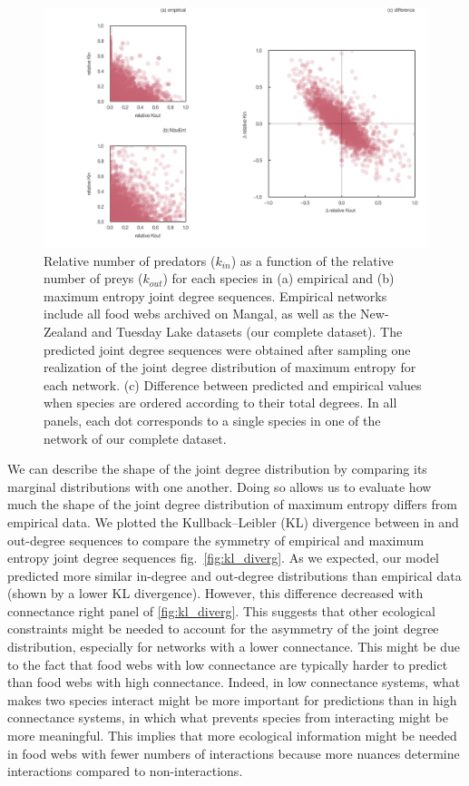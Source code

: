 \documentclass[10pt,oneside]{article}
\makeatletter
\def\maxwidth{\ifdim\Gin@nat@width>\linewidth\linewidth
\else\Gin@nat@width\fi}
\let\Oldincludegraphics\includegraphics
\renewcommand{\includegraphics}[1]{\Oldincludegraphics[width=\maxwidth]{#1}}
\makeatother
\begin{document}
\begin{figure}
\hypertarget{fig:joint_dd}{%
\centering
\includegraphics{figures/joint_degree_dist.png}
\caption{Relative number of predators (\(k_{in}\)) as a function of the
relative number of preys (\(k_{out}\)) for each species in (a) empirical
and (b) maximum entropy joint degree sequences. Empirical networks
include all food webs archived on Mangal, as well as the New-Zealand and
Tuesday Lake datasets (our complete dataset). The predicted joint degree
sequences were obtained after sampling one realization of the joint
degree distribution of maximum entropy for each network. (c) Difference
between predicted and empirical values when species are ordered
according to their total degrees. In all panels, each dot corresponds to
a single species in one of the network of our complete
dataset.}\label{fig:joint_dd}
}
\end{figure}

We can describe the shape of the joint degree distribution by comparing
its marginal distributions with one another. Doing so allows us to
evaluate how much the shape of the joint degree distribution of maximum
entropy differs from empirical data. We plotted the Kullback--Leibler
(KL) divergence between in and out-degree sequences to compare the
symmetry of empirical and maximum entropy joint degree sequences
fig.~\ref{fig:kl_diverg}. As we expected, our model predicted more
similar in-degree and out-degree distributions than empirical data
(shown by a lower KL divergence). However, this difference decreased
with connectance right panel of \ref{fig:kl_diverg}. This suggests that
other ecological constraints might be needed to account for the
asymmetry of the joint degree distribution, especially for networks with
a lower connectance. This might be due to the fact that food webs with
low connectance are typically harder to predict than food webs with high
connectance. Indeed, in low connectance systems, what makes two species
interact might be more important for predictions than in high
connectance systems, in which what prevents species from interacting
might be more meaningful. This implies that more ecological information
might be needed in food webs with fewer numbers of interactions because
more nuances determine interactions compared to non-interactions.
\end{document}
